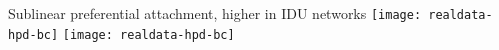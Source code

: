 \begin{frame}{Sublinear preferential attachment, higher in IDU networks}
    \texttt{[image: realdata-hpd-bc]}
    \texttt{[image: realdata-hpd-bc]}
\end{frame}

